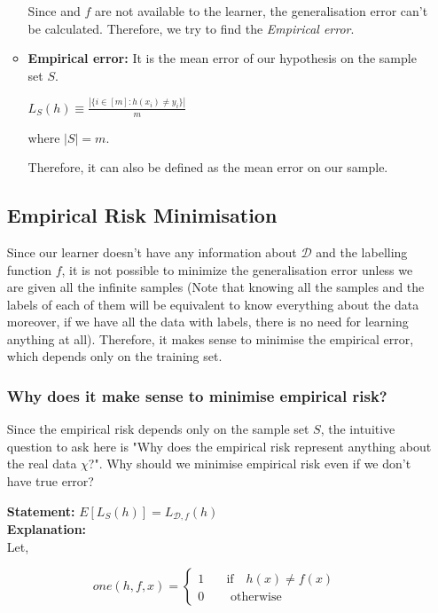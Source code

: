 \documentclass[a4paper]{article}
\begin{document}
\begin{itemize}
\begin{itemize}
            Since  and $f$ are not available to the learner, the generalisation error can't be calculated. Therefore, we try to find the \textit{Empirical error}.
            \item \textbf{Empirical error: } It is the mean error of our hypothesis on the sample set $S$.
                \begin{center}
                    $L_S(h) \equiv \frac{|\{i\in[m]:h(x_i) \neq y_i\}|}{m}$
                \end{center}
            where $|S| = m$.
            
            Therefore, it can also be defined as the mean error on our sample.
        \end{itemize}
        \newpage
        
    \subsection{Empirical Risk Minimisation}
    Since our learner doesn't have any information about $\mathcal{D}$ and the labelling function $f$, it is not possible to minimize the generalisation error unless we are given all the infinite samples (Note that knowing all the samples and the labels of each of them will be equivalent to know everything about the data moreover, if we have all the data with labels, there is no need for learning anything at all). Therefore, it makes sense to minimise the empirical error, which depends only on the training set.
        \subsubsection{Why does it make sense to minimise empirical risk?}
        Since the empirical risk depends only on the sample set $S$, the intuitive question to ask here is "Why does the empirical risk represent anything about the real data $\chi$?". Why should we minimise empirical risk even if we don't have true error?
        
        \textbf{Statement: } $E[L_S(h)] = L_{\mathcal{D},f}(h)$ \\
        \textbf{Explanation: } \\
            Let,
            \begin{center}
              
            \[ one(h,f,x) =
                  \begin{cases}
                    1   & \quad \text{if }\text{ $h(x) \neq f(x)$ }\\
                    0  & \quad \text{ otherwise}
                  \end{cases}
                \]
            \end{center}
            

\end{itemize}
\end{document}
